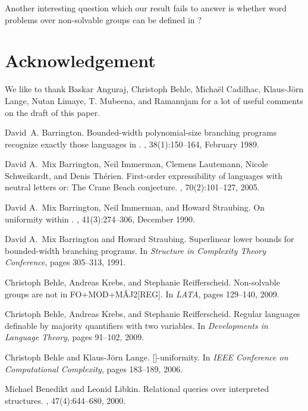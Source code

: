 \documentclass[envcountsame]{llncs}
\begin{document}
Another interesting question which our result fails to answer is whether word problems over non-solvable groups can be defined in
 \cite{krebs_infGroups}?
\section*{Acknowledgement}
\noindent We like to thank Baskar Anguraj, Christoph Behle, Micha\"el Cadilhac, Klaus-J\"orn Lange, Nutan Limaye, T. Mubeena, and Ramanujam for a lot of useful comments on the draft of this paper.

\begin{thebibliography}{10}

David~A. Barrington.
\newblock Bounded-width polynomial-size branching programs recognize exactly
  those languages in {}.
, 38(1):150--164,
  February 1989.

David A.~Mix Barrington, Neil Immerman, Clemens Lautemann, Nicole Schweikardt,
  and Denis Th{\'e}rien.
\newblock First-order expressibility of languages with neutral letters or: The
  {C}rane {B}each conjecture.
, 70(2):101--127, 2005.

David A.~Mix Barrington, Neil Immerman, and Howard Straubing.
\newblock On uniformity within {}.
, 41(3):274--306,
  December 1990.

David A.~Mix Barrington and Howard Straubing.
\newblock Superlinear lower bounds for bounded-width branching programs.
\newblock In {\em Structure in Complexity Theory Conference}, pages 305--313,
  1991.

Christoph Behle, Andreas Krebs, and Stephanie Reifferscheid.
\newblock Non-solvable groups are not in {FO+MOD+M{\^A}J2[REG]}.
\newblock In {\em LATA}, pages 129--140, 2009.

Christoph Behle, Andreas Krebs, and Stephanie Reifferscheid.
\newblock Regular languages definable by majority quantifiers with two
  variables.
\newblock In {\em Developments in Language Theory}, pages 91--102, 2009.

Christoph Behle and Klaus-J{\"o}rn Lange.
[]-uniformity.
\newblock In {\em IEEE Conference on Computational Complexity}, pages 183--189,
  2006.

Michael Benedikt and Leonid Libkin.
\newblock Relational queries over interpreted structures.
, 47(4):644--680, 2000.


\end{thebibliography}
\end{document}
